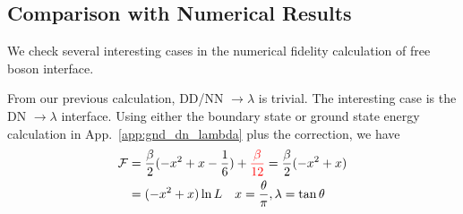 \documentclass{article}
\begin{document}


\subsection{Comparison with Numerical Results}

We check several interesting cases in the numerical fidelity calculation of free boson interface. 

From our previous calculation, DD/NN $\rightarrow \lambda$ is trivial. The interesting case is the DN $\rightarrow \lambda$ interface. Using either the boundary state or ground state energy calculation in App.~\ref{app:gnd_dn_lambda} plus the correction, we have
\begin{equation}
\begin{aligned}
\mathcal{F} &= \frac{\beta}{2}( - x^2 + x - \frac{1}{6} ) + {\color{red} \frac{\beta}{12}} = \frac{\beta}{2}( - x^2 + x ) \\
&= ( - x^2 + x ) \ln L  \quad x = \frac{\theta}{\pi}, \lambda = \tan \theta 
\end{aligned}
\end{equation}
\end{document}
